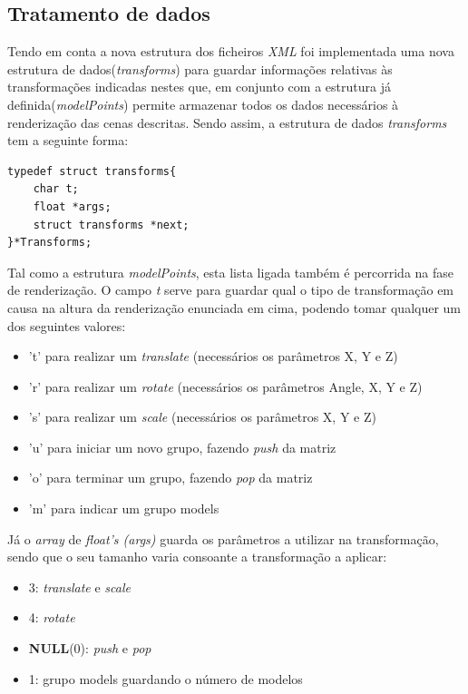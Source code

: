 \documentclass{article}
\begin{document}
\subsection{Tratamento de dados}
Tendo em conta a nova estrutura dos ficheiros \textit{XML} foi implementada uma nova estrutura de dados(\textit{transforms}) para guardar informações relativas às transformações indicadas nestes que, em conjunto com a estrutura já definida(\textit{modelPoints}) permite armazenar todos os dados necessários à renderização das cenas descritas.
Sendo assim, a estrutura de dados \textit{transforms} tem a seguinte forma:
\begin{verbatim}
typedef struct transforms{
    char t;
    float *args;
    struct transforms *next;
}*Transforms;
\end{verbatim}
Tal como a estrutura \textit{modelPoints}, esta lista ligada também é percorrida na fase de renderização. O campo \textit{t} serve para guardar qual o tipo de transformação em causa na altura da renderização enunciada em cima, podendo tomar qualquer um dos seguintes valores:
\begin{itemize}
    \item 't' para realizar um \textit{translate} (necessários os parâmetros X, Y e Z)
    \item 'r' para realizar um \textit{rotate} (necessários os parâmetros Angle, X, Y e Z)
    \item 's' para realizar um \textit{scale} (necessários os parâmetros X, Y e Z)
    \item 'u' para iniciar um novo grupo, fazendo \textit{push} da matriz
    \item 'o' para terminar um grupo, fazendo \textit{pop} da matriz
    \item 'm' para indicar um grupo models
\end{itemize}
Já o \textit{array} de \textit{float's (args)} guarda os parâmetros a utilizar na transformação, sendo que o seu tamanho varia consoante a transformação a aplicar:
\begin{itemize}
    \item 3: \textit{translate} e \textit{scale}
    \item 4: \textit{rotate}
    \item \textbf{NULL}(0): \textit{push} e \textit{pop}
    \item 1: grupo models guardando o número de modelos
\end{itemize}
\end{document}
